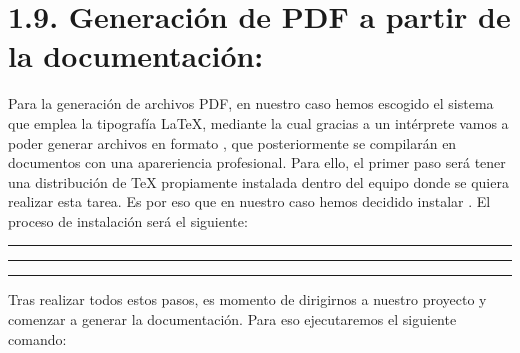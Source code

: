 \documentclass[a4paper,10pt,spanish]{sphinxmanual}
\begin{document}
\section{1.9. Generación de PDF a partir de la documentación:}
\label{\detokenize{1_configuracion_inicial/generacion_pdf:generacion-de-pdf-a-partir-de-la-documentacion}}\label{\detokenize{1_configuracion_inicial/generacion_pdf::doc}}
\sphinxAtStartPar
Para la generación de archivos PDF, en nuestro caso hemos escogido el sistema que emplea la tipografía LaTeX, mediante la cual gracias a un intérprete vamos a poder generar archivos en formato , que posteriormente se compilarán en documentos  con una apareriencia profesional. Para ello, el primer paso será tener una distribución de TeX propiamente instalada dentro del equipo donde se quiera realizar esta tarea. Es por eso que en nuestro caso hemos decidido instalar . El proceso de instalación será el siguiente:

\sphinxAtStartPar
{}


\bigskip\hrule\bigskip


\sphinxAtStartPar
{}


\bigskip\hrule\bigskip


\sphinxAtStartPar
{}


\bigskip\hrule\bigskip


\sphinxAtStartPar
Tras realizar todos estos pasos, es momento de dirigirnos a nuestro proyecto y comenzar a generar la documentación. Para eso ejecutaremos el siguiente comando:

\begin{sphinxVerbatim}[commandchars=\\\{\}]
\PYGZbs{}  \PYGZbs{} 
\end{sphinxVerbatim}
\end{document}
